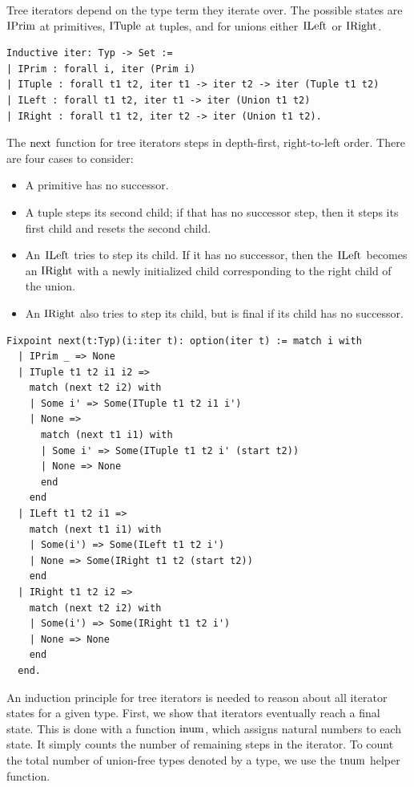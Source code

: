 \documentclass[a4paper,english]{lipics-v2019}
\renewcommand{\c}[1]{\ensuremath{\text{\lstinline{#1}}}\xspace}
\begin{document}
Tree iterators depend on the type term they iterate over. The possible
states are \c{IPrim} at primitives, \c{ITuple} at tuples, and for unions
either \c{ILeft} or \c{IRight}.

\begin{lstlisting}
Inductive iter: Typ -> Set :=
| IPrim : forall i, iter (Prim i)
| ITuple : forall t1 t2, iter t1 -> iter t2 -> iter (Tuple t1 t2)
| ILeft : forall t1 t2, iter t1 -> iter (Union t1 t2)
| IRight : forall t1 t2, iter t2 -> iter (Union t1 t2).
\end{lstlisting}

\noindent
The \c{next} function for tree iterators steps in depth-first,
right-to-left order. There are four cases to consider:
\begin{itemize}
  \item A primitive has no successor.
  \item A tuple steps its second child; if that
has no successor step, then it steps its first child and resets the second
child.
  \item An \c{ILeft} tries to step its child. If it has no successor, then the \c{ILeft} becomes an \c{IRight} with a newly initialized child corresponding to the right child of the union.
  \item An \c{IRight} also tries to step its child, but is final if its child has no successor.
  \end{itemize}

\begin{lstlisting}
Fixpoint next(t:Typ)(i:iter t): option(iter t) := match i with
  | IPrim _ => None
  | ITuple t1 t2 i1 i2 =>
    match (next t2 i2) with
    | Some i' => Some(ITuple t1 t2 i1 i')
    | None =>
      match (next t1 i1) with
      | Some i' => Some(ITuple t1 t2 i' (start t2))
      | None => None
      end
    end
  | ILeft t1 t2 i1 =>
    match (next t1 i1) with
    | Some(i') => Some(ILeft t1 t2 i')
    | None => Some(IRight t1 t2 (start t2))
    end
  | IRight t1 t2 i2 => 
    match (next t2 i2) with
    | Some(i') => Some(IRight t1 t2 i')
    | None => None
    end
  end.
\end{lstlisting}

\noindent
An induction principle for tree iterators is needed to reason about all
iterator states for a given type. First, we show that iterators eventually
reach a final state. This is done with a function \c{inum}, which assigns
natural numbers to each state. It simply counts the number of remaining
steps in the iterator. To count the total number of union-free types 
denoted by a type, we use the \c{tnum} helper function.
\end{document}
